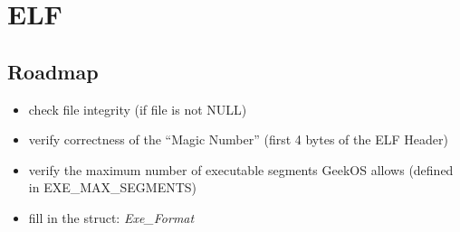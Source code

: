 \documentclass{article}
\begin{document}
\section{ELF}


\subsection{Roadmap}
\begin{itemize}
  \item check file integrity (if file is not NULL)
  \item verify correctness of the ``Magic Number'' (first 4 bytes of the ELF Header)%
  \item verify the maximum number of executable segments GeekOS allows  (defined in EXE\_MAX\_SEGMENTS)%
  \item fill in the struct: \textit{Exe\_Format}
\end{itemize}
\end{document}
